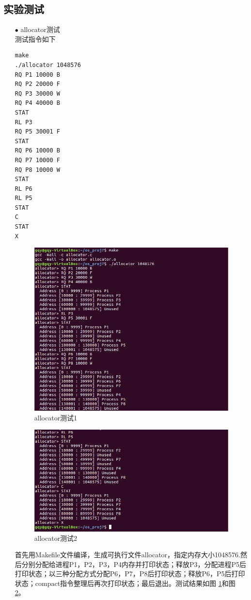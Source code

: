 \documentclass{article}
\begin{document}
\subsection{实验测试}
\begin{itemize}
\item[$\bullet$]allocator测试\\%
测试指令如下
\begin{lstlisting}[language={[ANSI]C}]
make
./allocator 1048576
RQ P1 10000 B
RQ P2 20000 F
RQ P3 30000 W
RQ P4 40000 B
STAT
RL P3
RQ P5 30001 F
STAT
RQ P6 10000 B
RQ P7 10000 F
RQ P8 10000 W
STAT
RL P6
RL P5
STAT
C
STAT
X
\end{lstlisting}
\begin{figure}[htbp]
		\centering
		\includegraphics{a1}
		\caption{allocator测试1} \label{allocator测试1}
\end{figure}
\begin{figure}[htbp]
		\centering
		\includegraphics{a2}
		\caption{allocator测试2} \label{allocator测试2}
\end{figure}
\newpage
首先用Makefile文件编译，生成可执行文件allocator，指定内存大小1048576.然后分别分配给进程P1，P2，P3，P4内存并打印状态；释放P3，分配进程P5后打印状态；以三种分配方式分配P6，P7，P8后打印状态；释放P6，P5后打印状态；compact指令整理后再次打印状态；最后退出。测试结果如图 \ref{allocator测试1}和图 \ref{allocator测试2}。
\end{itemize}
\end{document}
